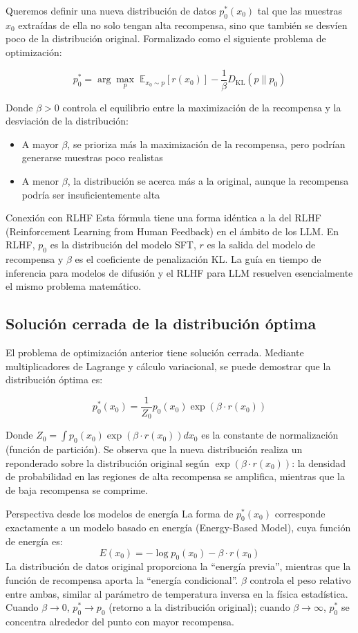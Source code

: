 Queremos definir una nueva distribución de datos $p_0^*(x_0)$ tal que las muestras $x_0$ extraídas de ella no solo tengan alta recompensa, sino que también se desvíen poco de la distribución original. Formalizado como el siguiente problema de optimización:

$$p_0^* = \arg\max_{p} \; \mathbb{E}_{x_0 \sim p}[r(x_0)] - \frac{1}{\beta} D_{\mathrm{KL}}(p \| p_0)$$

Donde $\beta > 0$ controla el equilibrio entre la maximización de la recompensa y la desviación de la distribución:
\begin{itemize}
    \item A mayor $\beta$, se prioriza más la maximización de la recompensa, pero podrían generarse muestras poco realistas
    \item A menor $\beta$, la distribución se acerca más a la original, aunque la recompensa podría ser insuficientemente alta
\end{itemize}

\begin{knowledgebox}{Conexión con RLHF}
Esta fórmula tiene una forma idéntica a la del RLHF (Reinforcement Learning from Human Feedback) en el ámbito de los LLM. En RLHF, $p_0$ es la distribución del modelo SFT, $r$ es la salida del modelo de recompensa y $\beta$ es el coeficiente de penalización KL. La guía en tiempo de inferencia para modelos de difusión y el RLHF para LLM resuelven esencialmente el mismo problema matemático.
\end{knowledgebox}

\subsection{Solución cerrada de la distribución óptima}

El problema de optimización anterior tiene solución cerrada. Mediante multiplicadores de Lagrange y cálculo variacional, se puede demostrar que la distribución óptima es:

$$p_0^*(x_0) = \frac{1}{Z_0} p_0(x_0) \exp(\beta \cdot r(x_0))$$

Donde $Z_0 = \int p_0(x_0) \exp(\beta \cdot r(x_0)) dx_0$ es la constante de normalización (función de partición). Se observa que la nueva distribución realiza un reponderado sobre la distribución original según $\exp(\beta \cdot r(x_0))$: la densidad de probabilidad en las regiones de alta recompensa se amplifica, mientras que la de baja recompensa se comprime.

\begin{knowledgebox}{Perspectiva desde los modelos de energía}
La forma de $p_0^*(x_0)$ corresponde exactamente a un modelo basado en energía (Energy-Based Model), cuya función de energía es:
$$E(x_0) = -\log p_0(x_0) - \beta \cdot r(x_0)$$
La distribución de datos original proporciona la ``energía previa'', mientras que la función de recompensa aporta la ``energía condicional''. $\beta$ controla el peso relativo entre ambas, similar al parámetro de temperatura inversa en la física estadística. Cuando $\beta \to 0$, $p_0^* \to p_0$ (retorno a la distribución original); cuando $\beta \to \infty$, $p_0^*$ se concentra alrededor del punto con mayor recompensa.
\end{knowledgebox}

